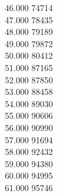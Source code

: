{ 46.000	74714 \\
 47.000	78435 \\
 48.000	79189 \\
 49.000	79872 \\
 50.000	80412 \\
 51.000	87165 \\
 52.000	87850 \\
 53.000	88458 \\
 54.000	89030 \\
 55.000	90606 \\
 56.000	90990 \\
 57.000	91694 \\
 58.000	92432 \\
 59.000	94380 \\
 60.000	94995 \\
 61.000	95746 \\
}
